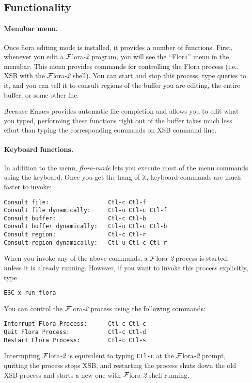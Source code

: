 \documentclass[11pt]{article}
\newcommand{\FLORA}{{\mbox{${\cal F}${\sc lora}\rm\emph{-2}}}\xspace}
\begin{document}
\subsection{Functionality}


\paragraph{Menubar menu.}
Once flora editing mode is installed, it provides a number of functions.
First, whenever you edit a \FLORA program, you will see the ``Flora'' menu
in the menubar. This menu provides commands for controlling the Flora
process (i.e., XSB with the \FLORA shell). You can start and stop
this process, type queries to it, and you can tell it to consult regions of
the buffer you are editing, the entire buffer, or some other file.

Because Emacs provides automatic file completion and allows you to edit
what you typed, performing these functions right out of the buffer takes
much less effort than typing the corresponding commands on XSB command
line.

\paragraph{Keyboard functions.}
In addition to the menu, \emph{flora-mode} lets you execute most of the
menu commands using the keyboard. Once you get the hang of it, keyboard
commands are much faster to invoke:
\begin{verbatim}
Consult file:                 Ctl-c Ctl-f
Consult file dynamically:     Ctl-u Ctl-c Ctl-f
Consult buffer:               Ctl-c Ctl-b
Consult buffer dynamically:   Ctl-u Ctl-c Ctl-b
Consult region:               Ctl-c Ctl-r
Consult region dynamically:   Ctl-u Ctl-c Ctl-r
\end{verbatim}
When you invoke any of the above commands, a \FLORA process is started,
unless it is already running. However, if you want to invoke this process
explicitly, type
\begin{verbatim}
ESC x run-flora  
\end{verbatim}
You can control the \FLORA process using the following commands:
\begin{verbatim}
Interrupt Flora Process:      Ctl-c Ctl-c
Quit Flora Process:           Ctl-c Ctl-d
Restart Flora Process:        Ctl-c Ctl-s
\end{verbatim}
Interrupting \FLORA is equivalent to typing {\tt Ctl-c} at the \FLORA
prompt, quitting the process stops XSB, and restarting the process shuts
down the old XSB process and starts a new one with \FLORA shell running.
\end{document}
